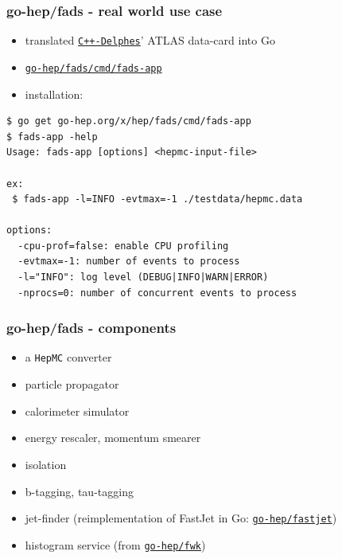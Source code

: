 \documentclass[9pt]{beamer}
\newcommand{\myblue} [1] {{\color{blue}#1}}
\begin{document}
\begin{frame}[fragile]
\frametitle{go-hep/fads - real world use case}


\begin{itemize}
\item translated \myblue{\href{https://cp3.irmp.ucl.ac.be/projects/delphes}{\texttt{C++-Delphes}}}' ATLAS data-card into Go
\item \myblue{\href{https://github.com/go-hep/hep/blob/master/fads/cmd/fads-app/main.go}{\texttt{go-hep/fads/cmd/fads-app}}}
\item installation:
\end{itemize}


	\begin{block}{}
\begin{verbatim}
$ go get go-hep.org/x/hep/fads/cmd/fads-app
$ fads-app -help
Usage: fads-app [options] <hepmc-input-file>

ex:
 $ fads-app -l=INFO -evtmax=-1 ./testdata/hepmc.data

options:
  -cpu-prof=false: enable CPU profiling
  -evtmax=-1: number of events to process
  -l="INFO": log level (DEBUG|INFO|WARN|ERROR)
  -nprocs=0: number of concurrent events to process

\end{verbatim}
	\end{block}{}


\end{frame}

\begin{frame}[fragile]
\frametitle{go-hep/fads - components}


\begin{itemize}
\item a \texttt{HepMC} converter
\item particle propagator
\item calorimeter simulator
\item energy rescaler, momentum smearer
\item isolation
\item b-tagging, tau-tagging
\item jet-finder (reimplementation of FastJet in Go: \myblue{\href{https://go-hep.org/x/hep/fastjet}{\texttt{go-hep/fastjet}}})
\item histogram service (from \myblue{\href{https://go-hep.org/x/hep/fwk}{\texttt{go-hep/fwk}}})
\end{itemize}

\end{frame}
\end{document}
